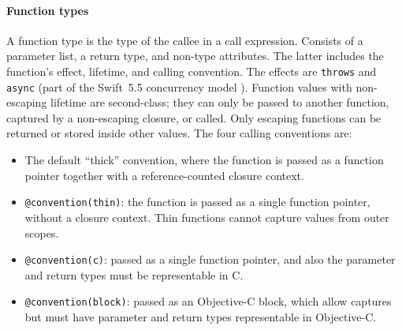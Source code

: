 \documentclass[../generics]{subfiles}
\begin{document}
\paragraph{Function types} A function type is the type of the callee in a call expression. Consists of a parameter list, a return type, and non-type attributes. The latter includes the function's effect, lifetime, and calling convention. The effects are \texttt{throws} and \texttt{async} (part of the Swift~5.5 concurrency model \cite{se0296}). Function values with non-escaping lifetime are second-class; they can only be passed to another function, captured by a non-escaping closure, or called. Only escaping functions can be returned or stored inside other values. The four calling conventions are:
\begin{itemize}
\item The default ``thick'' convention, where the function is passed as a function pointer together with a reference-counted closure context.
\item \texttt{@convention(thin)}: the function is passed as a single function pointer, without a closure context. Thin functions cannot capture values from outer scopes.
\item \texttt{@convention(c)}: passed as a single function pointer, and also the parameter and return types must be representable in C.
\item \texttt{@convention(block)}: passed as an Objective-C block, which allow captures but must have parameter and return types representable in Objective-C.
\end{itemize}
\end{document}
